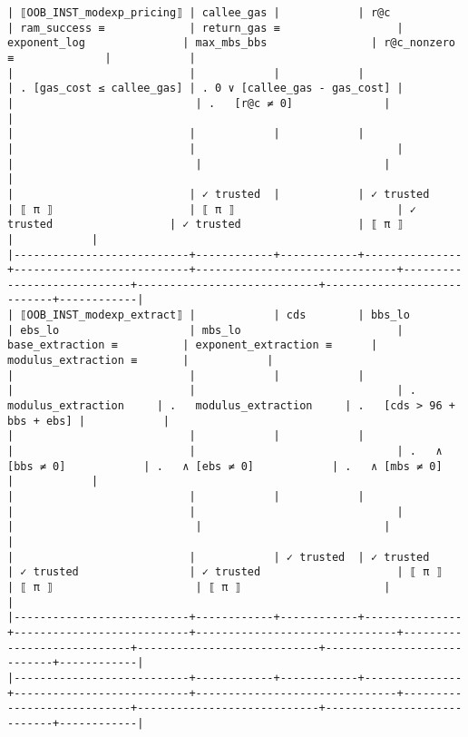 \documentclass[varwidth=\maxdimen,margin=0.5cm,multi={verbatim}]{standalone}
\begin{document}
\begin{verbatim}
| ⟦OOB_INST_modexp_pricing⟧ | callee_gas |            | r@c           | ram_success ≡             | return_gas ≡                  | exponent_log               | max_mbs_bbs                | r@c_nonzero ≡              |            |
|                           |            |            |               | . [gas_cost ≤ callee_gas] | . 0 ∨ [callee_gas - gas_cost] |                            |                            | .   [r@c ≠ 0]              |            |
|                           |            |            |               |                           |                               |                            |                            |                            |            |
|                           | ✓ trusted  |            | ✓ trusted     | ⟦ π ⟧                     | ⟦ π ⟧                         | ✓ trusted                  | ✓ trusted                  | ⟦ π ⟧                      |            |
|---------------------------+------------+------------+---------------+---------------------------+-------------------------------+----------------------------+----------------------------+----------------------------+------------|
| ⟦OOB_INST_modexp_extract⟧ |            | cds        | bbs_lo        | ebs_lo                    | mbs_lo                        | base_extraction ≡          | exponent_extraction ≡      | modulus_extraction ≡       |            |
|                           |            |            |               |                           |                               | .   modulus_extraction     | .   modulus_extraction     | .   [cds > 96 + bbs + ebs] |            |
|                           |            |            |               |                           |                               | .   ∧ [bbs ≠ 0]            | .   ∧ [ebs ≠ 0]            | .   ∧ [mbs ≠ 0]            |            |
|                           |            |            |               |                           |                               |                            |                            |                            |            |
|                           |            | ✓ trusted  | ✓ trusted     | ✓ trusted                 | ✓ trusted                     | ⟦ π ⟧                      | ⟦ π ⟧                      | ⟦ π ⟧                      |            |
|---------------------------+------------+------------+---------------+---------------------------+-------------------------------+----------------------------+----------------------------+----------------------------+------------|
|---------------------------+------------+------------+---------------+---------------------------+-------------------------------+----------------------------+----------------------------+----------------------------+------------|

\end{verbatim}
\end{document}
